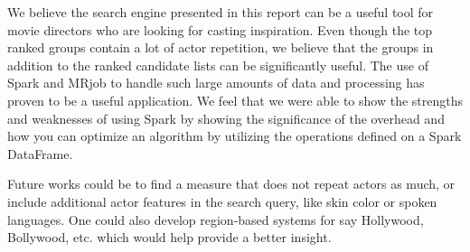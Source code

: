 We believe the search engine presented in this report can be a useful tool for movie directors who are looking for casting inspiration. Even though the top ranked groups contain a lot of actor repetition, we believe that the groups in addition to the ranked candidate lists can be significantly useful. The use of Spark and MRjob to handle such large amounts of data and processing has proven to be a useful application. We feel that we were able to show the strengths and weaknesses of using Spark by showing the significance of the overhead and how you can optimize an algorithm by utilizing the operations defined on a Spark DataFrame.

Future works could be to find a measure that does not repeat actors as much, or include additional actor features in the search query, like skin color or spoken languages. One could also develop region-based systems for say Hollywood, Bollywood, etc. which would help provide a better insight. 
